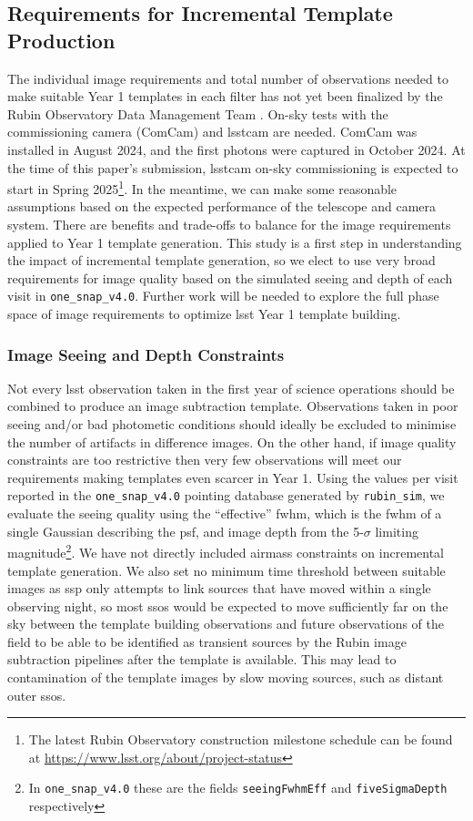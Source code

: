 \documentclass[preprintm,linenumbers]{aastex631}
\newcommand{\baseline}{\texttt{one\_snap\_v4.0}\xspace}
\newcommand{\rubinsim}{\texttt{rubin\_sim}\xspace}
\begin{document}
	\subsection{Requirements for Incremental Template Production}
	The individual image requirements and total number of observations needed to make suitable Year 1 templates in each filter has not yet been finalized by the Rubin Observatory Data Management Team \citep{DMTN-107,RTN-011}. 
 On-sky tests with the commissioning camera (ComCam) and \gls*{lsstcam} are needed. 
 ComCam was installed in August 2024, and the first photons were captured in October 2024. 
 At the time of this paper's submission, \gls*{lsstcam} on-sky commissioning is expected to start in Spring 2025\footnote{The latest Rubin Observatory construction milestone schedule can be found at \url{https://www.lsst.org/about/project-status}}. 
 In the meantime, we can make some reasonable assumptions based on the expected performance of the telescope and camera system. 
 There are benefits and trade-offs to balance for the image requirements applied to Year 1 template generation. This study is a first step in understanding the impact of incremental template generation,  so we elect to use very broad requirements for image quality based on the simulated seeing and depth of each visit in \baseline. 
 Further work will be needed to explore the full phase space of image requirements to optimize \gls*{lsst} Year 1 template building. 
	
	\subsubsection{Image Seeing and Depth Constraints}
	\label{sec:imageqa}
	Not every \gls*{lsst} observation taken in the first year of science operations should be combined to produce an image subtraction template. 
 Observations taken in  poor seeing and/or bad photometic conditions should ideally be excluded to minimise the number of artifacts in difference images. 
	On the other hand, if image quality constraints are too restrictive then very few observations will meet our requirements making templates even scarcer in Year 1.  
	Using the values per visit reported in the \baseline pointing database generated by \rubinsim, we evaluate the seeing quality using the ``effective” \gls*{fwhm}, which is the \gls*{fwhm} of a single Gaussian describing the \gls*{psf}, and image depth from the 5-$\sigma$ limiting magnitude\footnote{In \baseline these are the fields \texttt{seeingFwhmEff} and \texttt{fiveSigmaDepth} respectively}. 
	We have not directly included airmass constraints on incremental template generation. 
 We also set no minimum time threshold between suitable images as \gls*{ssp} only attempts to link sources that have moved within a single observing night, so most \glspl*{sso} would be expected to move sufficiently far on the sky between the template building observations and future observations of the field to be able to be identified as transient sources by the Rubin image subtraction pipelines after the template is available.
 This may lead to contamination of the template images by slow moving sources, such as distant outer \glspl*{sso}.
	
\end{document}
